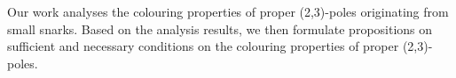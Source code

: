 

Our work analyses the colouring properties of proper (2,3)-poles originating from small snarks. Based on the analysis results, we then formulate propositions on sufficient and necessary conditions on the colouring properties of proper (2,3)-poles. 

